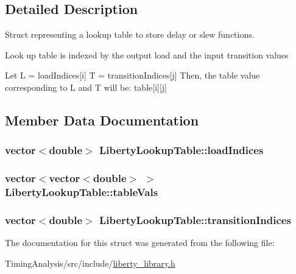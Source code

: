 \subsection{Detailed Description}
Struct representing a lookup table to store delay or slew functions. 

Look up table is indexed by the output load and the input transition values

Let L = load\-Indices\mbox{[}i\mbox{]} T = transition\-Indices\mbox{[}j\mbox{]} Then, the table value corresponding to L and T will be\-: table\mbox{[}i\mbox{]}\mbox{[}j\mbox{]} 

\subsection{Member Data Documentation}
\hypertarget{structLibertyLookupTable_aa9185452db835be3f9c603c3f3df5562}{
\subsubsection[{load\-Indices}]{\setlength{\rightskip}{0pt plus 5cm}vector$<$double$>$ Liberty\-Lookup\-Table\-::load\-Indices}}\label{structLibertyLookupTable_aa9185452db835be3f9c603c3f3df5562}
\hypertarget{structLibertyLookupTable_a1ca823f563ac9e3e8a616b09a19da596}{
\subsubsection[{table\-Vals}]{\setlength{\rightskip}{0pt plus 5cm}vector$<$vector$<$double$>$ $>$ Liberty\-Lookup\-Table\-::table\-Vals}}\label{structLibertyLookupTable_a1ca823f563ac9e3e8a616b09a19da596}
\hypertarget{structLibertyLookupTable_a1f7a1d2e84535f8c7df9bac33732634d}{
\subsubsection[{transition\-Indices}]{\setlength{\rightskip}{0pt plus 5cm}vector$<$double$>$ Liberty\-Lookup\-Table\-::transition\-Indices}}\label{structLibertyLookupTable_a1f7a1d2e84535f8c7df9bac33732634d}


The documentation for this struct was generated from the following file\-:\begin{DoxyCompactItemize}
\item 
Timing\-Analysis/src/include/\hyperlink{liberty__library_8h}{liberty\-\_\-library.\-h}\end{DoxyCompactItemize}
